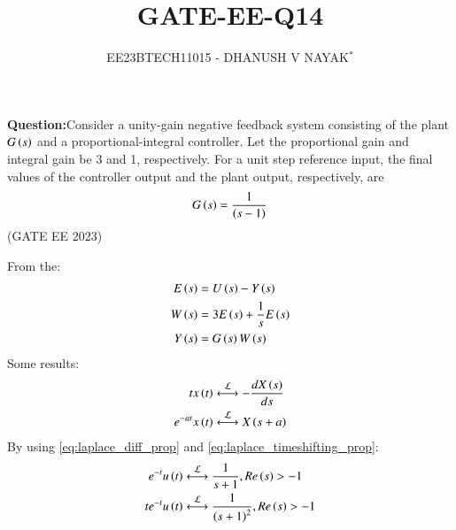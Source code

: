 \documentclass[journal,12pt,twocolumn]{IEEEtran}
\theoremstyle{remark}
\begin{document}

\title{GATE-EE-Q14}
\author{EE23BTECH11015 - DHANUSH V NAYAK$^{*}$%
}
\maketitle
\newpage
\bigskip
\renewcommand{\thefigure}{\arabic{figure}}
\renewcommand{\thetable}{\theenumi}
\textbf{Question:}Consider a unity-gain negative feedback system consisting of the plant $G\left(s\right)$  and a proportional-integral controller. Let the proportional gain and integral
gain be 3 and 1, respectively. For a unit step reference input, the final values of the
controller output and the plant output, respectively, are
\begin{align}
    G\left(s\right) = \frac{1}{\left(s-1\right)} \notag
\end{align} \hfill (GATE EE 2023)\\
\solution 

From the:
\begin{align}
    E\left(s\right)&= U\left(s\right) - Y\left(s\right)\label{eq:gate_ee_Q14.1}\\
W\left(s\right) &= 3E\left(s\right) + \frac{1}{s}E\left(s\right)\label{eq:gate_ee_Q14.2}\\
    Y\left(s\right) &= G\left(s\right)W\left(s\right) \label{eq:gate_ee_Q14.3}
\end{align}
Some results:
\begin{align}
    tx\brak{t} &\system{L} -\frac{d{X\brak{s}}}{ds} \label{eq:laplace_diff_prop}\\
    e^{-at}x\brak{t} &\system{L} X\brak{s+a}\label{eq:laplace_timeshifting_prop}
\end{align}
By using \eqref{eq:laplace_diff_prop} and \eqref{eq:laplace_timeshifting_prop}:
\begin{align}
    e^{-t}u\brak{t} &\system{L} \frac{1}{s+1} ,  Re\brak{s}>-1 \label{eq:gate_ee_Q14result.1}\\
    t e^{-t}u\brak{t} &\system{L} \frac{1}{\brak{s+1}^2},  Re\brak{s}>-1 
 \label{eq:gate_ee_Q14result.2}
\end{align}
\end{document}
